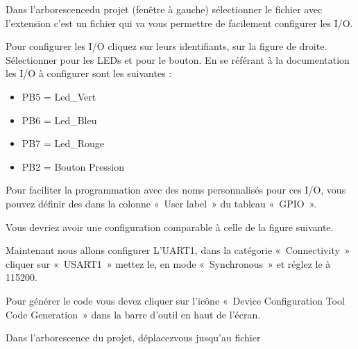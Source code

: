 \documentclass[letterpaper,10pt,french]{sphinxmanual}
\begin{document}
Dans l’arborescencedu projet (fenêtre à gauche) sélectionner le fichier avec l’extension  c’est un fichier qui va vous permettre de facilement configurer les I/O.

Pour configurer les I/O cliquez sur leurs identifiants, sur la figure de droite. Sélectionner  pour les LEDs et  pour le bouton.
En se référant à la documentation les I/O à configurer sont les suivantes :
\begin{itemize}
\item {} 
PB5 = Led\_Vert

\item {} 
PB6 = Led\_Bleu

\item {} 
PB7 = Led\_Rouge

\item {} 
PB2 = Bouton Pression

\end{itemize}

Pour faciliter la programmation avec des noms personnalisés pour ces I/O, vous pouvez définir des  dans la colonne « User label » du tableau « GPIO ».

Vous devriez avoir une configuration comparable à celle de la figure suivante.


Maintenant nous allons configurer L’UART1, dans la catégorie « Connectivity » cliquer sur « USART1 » mettez le, en mode « Synchronous » et réglez le  à 115200.


Pour générer le code vous devez cliquer sur l’icône « Device Configuration Tool Code Generation » dans la barre d’outil en haut de l’écran.


Dans l’arborescence du projet, déplacez\sphinxhyphen{}vous jusqu’au fichier 

\end{document}
